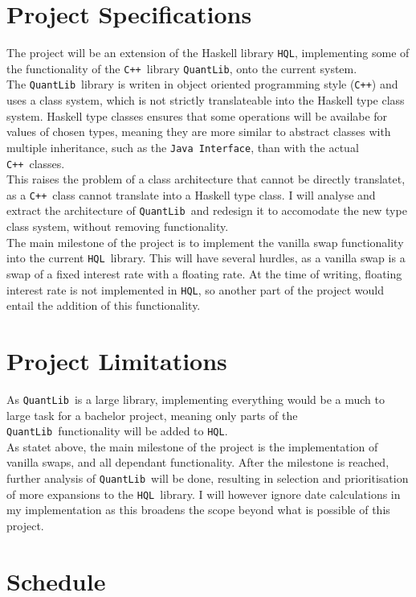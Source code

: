 \documentclass{article}
\newcommand{\HQL}{\texttt{HQL}}
\newcommand{\QL}{\texttt{QuantLib}}
\newcommand{\Cpp}{\texttt{C++}}
\begin{document}
\section{Project Specifications}
The project will be an extension of the Haskell library \HQL, implementing 
some of the functionality of the \Cpp\ library \QL\cite{QULI}, onto the current system.\\
The \QL\ library is writen in object oriented programming style (\Cpp) and uses a class system, 
which is not strictly translateable into the Haskell type class system.
Haskell type classes ensures that some operations will be availabe for values of chosen types, meaning they are
more similar to abstract classes with multiple inheritance, such as the \texttt{Java Interface}, 
than with the actual \Cpp\ classes. \\
This raises the problem of a class architecture that cannot be directly translatet, as a \Cpp\ class cannot translate
into a Haskell type class. I will analyse and extract the architecture of \QL\ and redesign it to accomodate
the new type class system, without removing functionality.\\
The main milestone of the project is to implement the vanilla swap functionality into the
current \HQL\ library. This will have several hurdles, as a vanilla swap is a swap of a fixed interest
rate with a floating rate. At the time of writing, floating interest rate is not implemented in \HQL, so 
another part of the project would entail the addition of this functionality. \\

\section{Project Limitations}
As \QL\ is a large library, implementing everything would be a much to large task
for a bachelor project, meaning only parts of the \QL\ functionality will be added to \HQL.\\
As statet above, the main milestone of the project is the implementation of vanilla swaps, and
all dependant functionality. After the milestone is reached, further analysis 
of \QL\ will be done, resulting in selection and prioritisation of more expansions to the \HQL\ library.
I will however ignore date calculations in my implementation as this broadens the scope beyond what is 
possible of this project. 

\section{Schedule}
\end{document}

